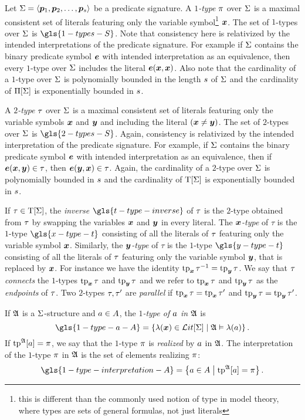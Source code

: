 Let $\mathrm{\Sigma} = \left\langle \bm{p}_{1}, \bm{p}_{2}, \dots, \bm{p}_{s} \right\rangle$ be a predicate signature.
A \emph{$1$-type} $\pi$ over $\mathrm{\Sigma}$ is a maximal consistent set of literals
featuring only the variable symbol\footnote{this is different than the
commonly used notion of type in model theory, where types are sets of general
formulas, not just literals} $\bm{x}$.
The set of $1$-types over $\mathrm{\Sigma}$ is $\gls{1-types-S}$.
Note that consistency here is relativized by the intended interpretations of the
predicate signature. For example if $\mathrm{\Sigma}$ contains the binary predicate symbol
$\bm{e}$ with intended interpretation as an equivalence, then every $1$-type over
$\mathrm{\Sigma}$ includes the literal $\bm{e}(\bm{x},\bm{x})$.
Also note that the cardinality of a $1$-type over $\mathrm{\Sigma}$ is polynomially
bounded in the length $s$ of $\mathrm{\Sigma}$ and the cardinality of $\Pi[\mathrm{\Sigma}]$ is
exponentially bounded in $s$.

A \emph{$2$-type} $\tau$ over $\mathrm{\Sigma}$ is a maximal consistent set of literals
featuring only the variable symbols $\bm{x}$ and $\bm{y}$ and including the literal
$(\bm{x} \neq \bm{y})$.
The set of $2$-types over $\mathrm{\Sigma}$ is $\gls{2-types-S}$.
Again, consistency is relativized by the intended interpretation of the
predicate signature.
For example, if $\mathrm{\Sigma}$ contains the binary predicate
symbol $\bm{e}$ with intended interpretation as an equivalence,
then if $\bm{e}(\bm{x}, \bm{y}) \in \tau$, then $\bm{e}(\bm{y}, \bm{x}) \in \tau$.
Again, the cardinality of a $2$-type over $\mathrm{\Sigma}$ is polynomially bounded in
$s$ and the cardinality of $\mathrm{T}[\mathrm{\Sigma}]$ is exponentially bounded in
$s$.

If $\tau \in \mathrm{T}[\mathrm{\Sigma}]$, the \emph{inverse} $\gls{t-type-inverse}$ of $\tau$
is the $2$-type obtained from $\tau$ by
swapping the variables $\bm{x}$ and $\bm{y}$ in every literal.
The \emph{$\bm{x}$-type} of $\tau$ is the $1$-type $\gls{x-type-t}$
consisting of all the literals of $\tau$ featuring only the variable symbol
$\bm{x}$. Similarly, the \emph{$\bm{y}$-type} of $\tau$ is the $1$-type
$\gls{y-type-t}$ consisting of all the literals of $\tau$ featuring only the
variable symbol $\bm{y}$, that is replaced by $\bm{x}$.
For instance we have the identity $\operatorname{tp}_{\bm{x}}\tau^{-1} = \operatorname{tp}_{\bm{y}}\tau$.
We say that $\tau$ \emph{connects} the $1$-types $\operatorname{tp}_{\bm{x}}\tau$ and $\operatorname{tp}_{\bm{y}}\tau$
and we refer to $\operatorname{tp}_{\bm{x}}\tau$ and $\operatorname{tp}_{\bm{y}}\tau$ as the \emph{endpoints} of $\tau$.
Two $2$-types $\tau,{\tau'}$ are \emph{parallel} if $\operatorname{tp}_{\bm{x}}\tau = \operatorname{tp}_{\bm{x}}{\tau'}$
and $\operatorname{tp}_{\bm{y}}\tau = \operatorname{tp}_{\bm{y}}{\tau'}$.

If $\mathfrak{A}$ is a $\mathrm{\Sigma}$-structure and $a \in A$, the
\emph{$1$-type of $a$ in $\mathfrak{A}$} is
\[
  \gls{1-type-a-A} = \setbd{\litl(\xx) \in \LitF\SigS}{\StrA \vDash \litl(\ea)}.
\]
If $\operatorname{tp}^{\mathfrak{A}}[a] = \pi$, we say that the $1$-type $\pi$ is \emph{realized}
by $a$ in $\mathfrak{A}$. The interpretation of the $1$-type $\pi$ in $\mathfrak{A}$ is
the set of elements realizing $\pi$:
\[
  \gls{1-type-interpretation-A} = \setbd{\ea \in \domA}{\tpIa\StrA\ea = \tpIp}.
\]

